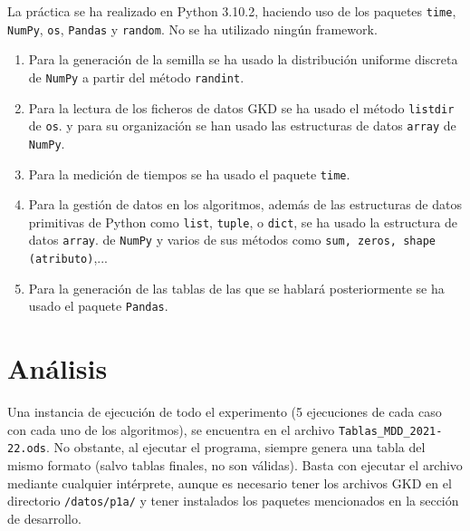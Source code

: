 \documentclass{article}
\begin{document}
    La práctica se ha realizado en Python 3.10.2, haciendo uso de los paquetes \texttt{time},
    \texttt{NumPy}, \texttt{os}, \texttt{Pandas} y \texttt{random}. No se ha utilizado ningún framework.
    \begin{enumerate}
        \item[]Para la generación de la semilla se ha usado la distribución uniforme discreta de \texttt{NumPy}
        a partir del método \texttt{randint}.
        \item[]Para la lectura de los ficheros de datos GKD se ha usado el método \texttt{listdir} de \texttt{os}.
        y para su organización se han usado las estructuras de datos \texttt{array} de \texttt{NumPy}.
        \item[]Para la medición de tiempos se ha usado el paquete \texttt{time}.
        \item[]Para la gestión de datos en los algoritmos, además de las estructuras de datos primitivas de 
        Python como \texttt{list}, \texttt{tuple}, o \texttt{dict}, se ha usado la estructura de datos \texttt{array}.
        de \texttt{NumPy} y varios de sus métodos como \texttt{sum, zeros, shape (atributo)},...
        \item[]Para la generación de las tablas de las que se hablará posteriormente se ha usado el paquete \texttt{Pandas}.
    \end{enumerate}

    \section{Análisis}

    Una instancia de ejecución de todo el experimento (5 ejecuciones de cada caso con cada uno de los algoritmos),
    se encuentra en el archivo \texttt{Tablas\_MDD\_2021-22.ods}. No obstante, al ejecutar el programa, siempre genera
    una tabla del mismo formato (salvo tablas finales, no son válidas). Basta con ejecutar el archivo mediante cualquier
    intérprete, aunque es necesario tener los archivos GKD en el directorio \texttt{/datos/p1a/} y tener instalados los paquetes mencionados
    en la sección de desarrollo.

\end{document}

